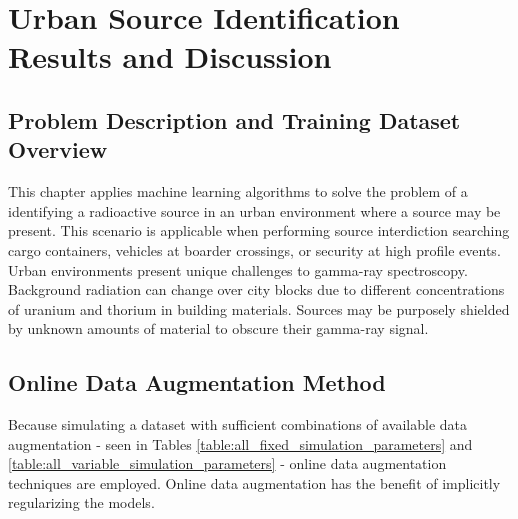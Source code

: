 \chapter{Urban Source Identification Results and Discussion}







\section{Problem Description and Training Dataset Overview}

This chapter applies machine learning algorithms to solve the problem of a identifying a radioactive source in an urban environment where a source may be present. This scenario is applicable when performing source interdiction searching cargo containers, vehicles at boarder crossings, or security at high profile events. Urban environments present unique challenges to gamma-ray spectroscopy. Background radiation can change over city blocks due to different concentrations of uranium and thorium in building materials. Sources may be purposely shielded by unknown amounts of material to obscure their gamma-ray signal.





\section{Online Data Augmentation Method}

Because simulating a dataset with sufficient combinations of available data augmentation - seen in Tables \ref{table:all_fixed_simulation_parameters} and \ref{table:all_variable_simulation_parameters} - online data augmentation techniques are employed. Online data augmentation has the benefit of implicitly regularizing the models.

